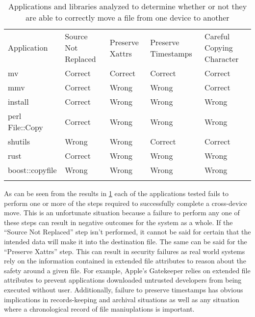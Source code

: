  \begin{table}[t]
    \scriptsize{}
    \begin{tabular}{l l l l l}
    \toprule{}
        Application     & Source Not Replaced & Preserve Xattrs & Preserve Timestamps & Careful Copying Character\\
        mv              & Correct             & Correct         & Correct             & Correct\\
        mmv             & Correct             & Wrong           & Wrong               & Correct\\
        install         & Correct             & Wrong           & Wrong               & Wrong\\
        perl File::Copy & Correct             & Wrong           & Wrong               & Wrong\\
        shutils         & Wrong               & Wrong           & Correct             & Correct\\
        rust            & Correct             & Wrong           & Wrong               & Wrong\\
        boost::copyfile & Wrong               & Wrong           & Wrong               & Wrong\\
    \bottomrule{}
    \end{tabular}
    \caption{Applications and libraries analyzed to determine whether or not
      they are able to correctly move a file from one device to another}
    \label{table:crossdevice}
\end{table}

As can be seen from the results in \ref{table:crossdevice} each of the
applications tested fails to perform one or more of the steps required to
successfully complete a cross-device move.  This is an unfortunate situation
because a failure to perform any one of these steps can result in negative
outcomes for the system as a whole.  If the ``Source Not Replaced'' step isn't
performed, it cannot be said for certain that the intended data will make it
into the destination file.  The same can be said for the ``Preserve Xattrs''
step.  This can result in security failures as real world systems rely on the
information contained in extended file attributes to reason about the safety
around a given file.  For example, Apple's Gatekeeper relies on extended file
attributes to prevent applications downloaded untrusted developers from being
executed without user.  Additionally, failure to preserve timestamps has obvious
implications in records-keeping and archival situations as well as any situation
where a chronological record of file maniuplations is important.

